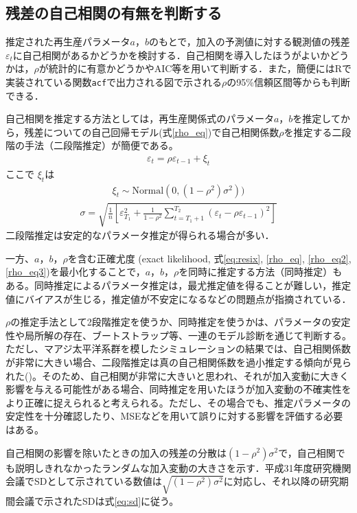 \documentclass[11pt]{jsarticle}
\begin{document}
\subsection{残差の自己相関の有無を判断する\label{estrho}}
推定された再生産パラメータ$a$，$b$のもとで，加入の予測値に対する観測値の残差$\varepsilon_t$に自己相関があるかどうかを検討する．自己相関を導入したほうがよいかどうかは，$\rho$が統計的に有意かどうかやAIC等を用いて判断する．また，簡便にはR\cite{R}で実装されている関数\verb|acf|で出力される図で示される$\rho$の95\%信頼区間等からも判断できる．

自己相関を推定する方法としては，再生産関係式のパラメータ$a$，$b$を推定してから，残差についての自己回帰モデル(式\ref{rho_eq})で自己相関係数$\rho$を推定する二段階の手法（二段階推定）が簡便である。
\begin{eqnarray}
  \varepsilon_t = \rho \varepsilon_{t-1} + \xi_t
  \label{rho_eq}
\end{eqnarray}
ここで $\xi_t$は
\begin{eqnarray}
  \xi_t \sim \mathrm{Normal}(0, (1-\rho^2) \sigma^2))　
  \label{rho_eq2}  
\end{eqnarray}
\begin{eqnarray}
  \sigma= \sqrt{ \frac{1}{n} \left[ \varepsilon_{T_1}^2 + \frac{1}{1-\rho^2} \sum_{t=T_1+1}^{T_2} (\varepsilon_t-\rho \varepsilon_{t-1})^2 \right]}
  \label{rho_eq3}    
\end{eqnarray}
二段階推定は安定的なパラメータ推定が得られる場合が多い．

一方、$a$，$b$，$\rho$を含む正確尤度 (exact likelihood, 式\ref{eq:resix}, \ref{rho_eq}, \ref{rho_eq2}, \ref{rho_eq3})を最小化することで，$a$，$b$，$\rho$を同時に推定する方法（同時推定）もある。同時推定によるパラメータ推定は，最尤推定値を得ることが難しい，推定値にバイアスが生じる，推定値が不安定になるなどの問題点が指摘されている\cite{johnson}．

$\rho$の推定手法として2段階推定を使うか、同時推定を使うかは、パラメータの安定性や局所解の存在、ブートストラップ等、一連のモデル診断を通じて判断する。ただし、マアジ太平洋系群を模したシミュレーションの結果では、自己相関係数が非常に大きい場合、二段階推定は真の自己相関係数を過小推定する傾向が見られた(\cite{rho_simulation})。そのため、自己相関が非常に大きいと思われ、それが加入変動に大きく影響を与える可能性がある場合、同時推定を用いたほうが加入変動の不確実性をより正確に捉えられると考えられる。ただし、その場合でも、推定パラメータの安定性を十分確認したり、MSEなどを用いて誤りに対する影響を評価する必要はある。

自己相関の影響を除いたときの加入の残差の分散は$(1-\rho^2) \sigma^2$で，自己相関でも説明しきれなかったランダムな加入変動の大きさを示す．平成31年度研究機関会議でSDとして示されている数値は$\sqrt{(1-\rho^2) \sigma^2}$に対応し、それ以降の研究期間会議で示されたSDは式\ref{eq:sd}に従う。
\end{document}

